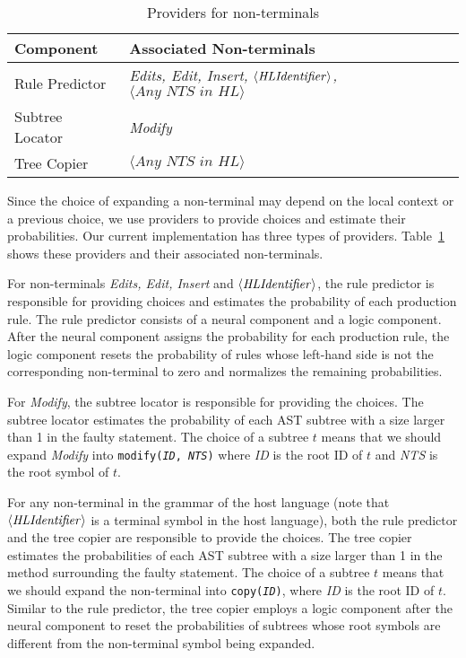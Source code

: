 \begin{table}[!t]
    \caption{Providers for non-terminals}
    \vspace{-2mm}
    \centering
    \small
    \begin{tabular}{l|l}
        \toprule
        {\textbf{ Component}} & \textbf{Associated Non-terminals}   \\
        \midrule
        Rule Predictor & \it Edits, Edit, Insert, $\langle \it HLIdentifier \rangle$, $\langle \textit{Any NTS in HL} \rangle$ \\
        \midrule
        Subtree Locator & \it Modify  \\
        \midrule
        Tree Copier & $\langle \textit{Any NTS in HL} \rangle$  \\
        \bottomrule
    \end{tabular}
    \label{tab:type}
\end{table}

Since the choice of expanding a non-terminal may depend on the local context or a previous choice, we use providers to provide choices and estimate their probabilities. Our current implementation has three types of providers. Table~\ref{tab:type} shows these providers and their associated non-terminals.

For non-terminals {\it Edits, Edit, Insert} and $\langle \it HLIdentifier \rangle$, the rule predictor is responsible for providing choices and estimates the probability of each production rule. The rule predictor consists of a neural component and a logic component. After the neural component assigns the probability for each production rule, the logic component resets the probability of rules whose left-hand side is not the corresponding non-terminal to zero and normalizes the remaining probabilities.

For {\it Modify}, the subtree locator is responsible for providing the choices. The subtree locator estimates the probability of each AST subtree with a size larger than 1 in the faulty statement. The choice of a subtree $t$ means that we should expand {\it Modify} into {\tt modify({\it ID}, {\it NTS})} where {\it ID} is the root ID of $t$ and {\it NTS} is the root symbol of $t$.

For any non-terminal in the grammar of the host language (note that $\langle \it HLIdentifier \rangle$ is a terminal symbol in the host language), both the rule predictor and the tree copier are responsible to provide the choices. The tree copier estimates the probabilities of each AST subtree with a size larger than 1 in the method surrounding the faulty statement. The choice of a subtree $t$ means that we should expand the non-terminal into {\tt copy({\it ID})}, where {\it ID} is the root ID of $t$. Similar to the rule predictor, the tree copier employs a logic component after the neural component to reset the probabilities of subtrees whose root symbols are different from the non-terminal symbol being expanded.

